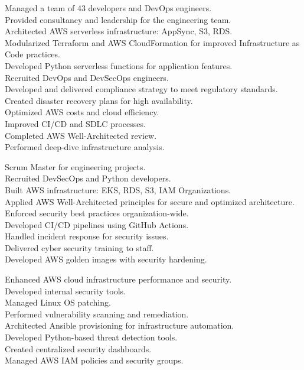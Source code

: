 \documentclass[10pt,a4paper,sans]{moderncv}
\begin{document}
{
	Managed a team of 43 developers and DevOps engineers.\\
	Provided consultancy and leadership for the engineering team.\\
	Architected AWS serverless infrastructure: AppSync, S3, RDS.\\
	Modularized Terraform and AWS CloudFormation for improved Infrastructure as Code practices.\\
	Developed Python serverless functions for application features.\\
	Recruited DevOps and DevSecOps engineers.\\
	Developed and delivered compliance strategy to meet regulatory standards.\\
	Created disaster recovery plans for high availability.\\
	Optimized AWS costs and cloud efficiency.\\
	Improved CI/CD and SDLC processes.\\
	Completed AWS Well-Architected review.\\
	Performed deep-dive infrastructure analysis.\\
}

{
	Scrum Master for engineering projects.\\
	Recruited DevSecOps and Python developers.\\
	Built AWS infrastructure: EKS, RDS, S3, IAM Organizations.\\
	Applied AWS Well-Architected principles for secure and optimized architecture.\\
	Enforced security best practices organization-wide.\\
	Developed CI/CD pipelines using GitHub Actions.\\
	Handled incident response for security issues.\\
	Delivered cyber security training to staff.\\
	Developed AWS golden images with security hardening.\\
}

{
	Enhanced AWS cloud infrastructure performance and security.\\
	Developed internal security tools.\\
	Managed Linux OS patching.\\
	Performed vulnerability scanning and remediation.\\
	Architected Ansible provisioning for infrastructure automation.\\
	Developed Python-based threat detection tools.\\
	Created centralized security dashboards.\\
	Managed AWS IAM policies and security groups.\\
}
\end{document}
